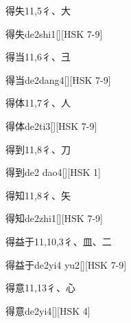 \begin{Entry}{得失}{11,5}{⼻、⼤}
  \begin{Phonetics}{得失}{de2shi1}[][HSK 7-9]
  \end{Phonetics}
\end{Entry}

\begin{Entry}{得当}{11,6}{⼻、⼹}
  \begin{Phonetics}{得当}{de2dang4}[][HSK 7-9]
  \end{Phonetics}
\end{Entry}

\begin{Entry}{得体}{11,7}{⼻、⼈}
  \begin{Phonetics}{得体}{de2ti3}[][HSK 7-9]
  \end{Phonetics}
\end{Entry}

\begin{Entry}{得到}{11,8}{⼻、⼑}
  \begin{Phonetics}{得到}{de2 dao4}[][HSK 1]
  \end{Phonetics}
\end{Entry}

\begin{Entry}{得知}{11,8}{⼻、⽮}
  \begin{Phonetics}{得知}{de2zhi1}[][HSK 7-9]
  \end{Phonetics}
\end{Entry}

\begin{Entry}{得益于}{11,10,3}{⼻、⽫、⼆}
  \begin{Phonetics}{得益于}{de2yi4 yu2}[][HSK 7-9]
  \end{Phonetics}
\end{Entry}

\begin{Entry}{得意}{11,13}{⼻、⼼}
  \begin{Phonetics}{得意}{de2yi4}[][HSK 4]
  \end{Phonetics}
\end{Entry}

